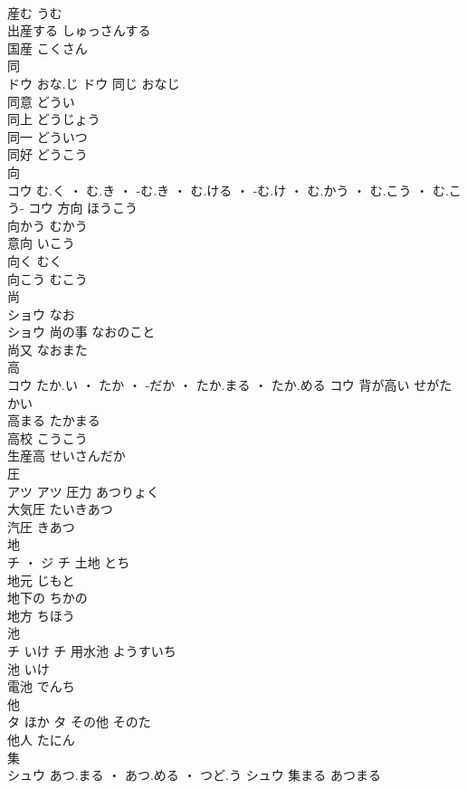 \documentclass[8pt]{extreport}
\begin{document}
\begin{CJK}{UTF8}{min}
\\	産む	うむ	
\\	出産する	しゅっさんする	
\\	国産	こくさん	
\\	同	
\\	ドウ	おな.じ	ドウ	同じ	おなじ	
\\	同意	どうい	
\\	同上	どうじょう	
\\	同一	どういつ	
\\	同好	どうこう	
\\	向	
\\	コウ	む.く ・ む.き ・ -む.き ・ む.ける ・ -む.け ・ む.かう ・ む.こう ・ む.こう-	コウ	方向	ほうこう	
\\	向かう	むかう	
\\	意向	いこう	
\\	向く	むく	
\\	向こう	むこう	
\\	尚	
\\	ショウ	なお
\\	ショウ	尚の事	なおのこと	
\\	尚又	なおまた	
\\	高	
\\	コウ	たか.い ・ たか ・ -だか ・ たか.まる ・ たか.める	コウ	背が高い	せがたかい	
\\	高まる	たかまる	
\\	高校	こうこう	
\\	生産高	せいさんだか	
\\	圧	
\\	アツ		アツ	圧力	あつりょく	
\\	大気圧	たいきあつ	
\\	汽圧	きあつ	
\\	地	
\\	チ ・ ジ		チ	土地	とち	
\\	地元	じもと	
\\	地下の	ちかの	
\\	地方	ちほう	
\\	池	
\\	チ	いけ	チ	用水池	ようすいち	
\\	池	いけ	
\\	電池	でんち	
\\	他	
\\	タ	ほか	タ	その他	そのた	
\\	他人	たにん	
\\	集	
\\	シュウ	あつ.まる ・ あつ.める ・ つど.う	シュウ	集まる	あつまる	

\end{CJK}
\end{document}

